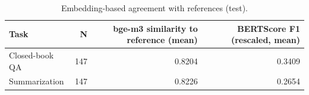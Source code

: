 \begin{table}[t]
\centering
\caption{Embedding-based agreement with references (test).}
\label{tab:t8_semantic_agreement}
\begin{tabular}{lrrr}
\toprule
Task & N & bge-m3 similarity to reference (mean) & BERTScore F1 (rescaled, mean) \\
\midrule
Closed-book QA & 147 & 0.8204 & 0.3409 \\
Summarization & 147 & 0.8226 & 0.2654 \\
\bottomrule
\end{tabular}
\end{table}
